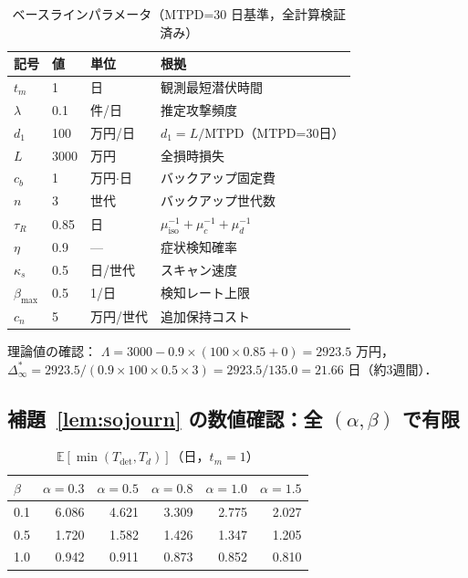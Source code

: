 \documentclass[12pt,a4paper]{article}
\theoremstyle{plain}
\theoremstyle{definition}
\theoremstyle{remark}
\newcommand{\E}{\mathbb{E}}
\newcommand{\Tdet}{T_{\mathrm{det}}}
\newcommand{\Dinf}{\Delta^{*}_{\infty}}
\newcommand{\La}{\Lambda}
\begin{document}
\begin{table}[h]
\centering\small
\caption{ベースラインパラメータ（MTPD=30 日基準，全計算検証済み）}
\label{tab:params}
\begin{tabular}{@{}lll p{60mm}@{}}
\toprule
記号 & 値 & 単位 & 根拠 \\
\midrule
$t_m$ & 1 & 日 & 観測最短潜伏時間~\cite{mandiant2023} \\
$\lambda$ & 0.1 & 件/日 & 推定攻撃頻度 \\
$d_1$ & 100 & 万円/日 & $d_1=L/\mathrm{MTPD}$（MTPD=30日）\\
$L$ & 3000 & 万円 & 全損時損失 \\
$c_b$ & 1 & 万円$\cdot$日 & バックアップ固定費 \\
$n$ & 3 & 世代 & バックアップ世代数 \\
$\tau_R$ & 0.85 & 日 & $\mu_{\mathrm{iso}}^{-1}+\mu_c^{-1}+\mu_d^{-1}$ \\
$\eta$ & 0.9 & --- & 症状検知確率 \\
$\kappa_s$ & 0.5 & 日/世代 & スキャン速度 \\
$\beta_{\max}$ & 0.5 & 1/日 & 検知レート上限 \\
$c_n$ & 5 & 万円/世代 & 追加保持コスト \\
\bottomrule
\end{tabular}
\end{table}

理論値の確認：
$\La=3000-0.9\times(100\times0.85+0)=2923.5$ 万円，
$\Dinf=2923.5/(0.9\times100\times0.5\times3)=2923.5/135.0=21.66$ 日（約3週間）．

\subsection{補題~\ref{lem:sojourn} の数値確認：全 $(\alpha,\beta)$ で有限}

\begin{table}[h]
\centering
\caption{$\E[\min(\Tdet,T_d)]$（日，$t_m=1$）}
\label{tab:sojourn}
\begin{tabular}{@{}lrrrrr@{}}
\toprule
$\beta$ & $\alpha=0.3$ & $\alpha=0.5$ & $\alpha=0.8$ & $\alpha=1.0$ & $\alpha=1.5$ \\
\midrule
0.1 & 6.086 & 4.621 & 3.309 & 2.775 & 2.027 \\
0.5 & 1.720 & 1.582 & 1.426 & 1.347 & 1.205 \\
1.0 & 0.942 & 0.911 & 0.873 & 0.852 & 0.810 \\
\bottomrule
\end{tabular}
\end{table}
\end{document}
